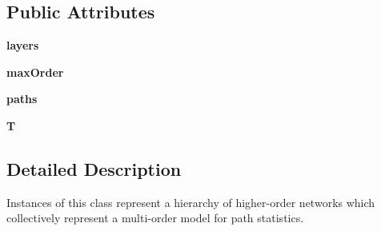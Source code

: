 \subsection*{Public Attributes}
\begin{DoxyCompactItemize}
\item 
\hypertarget{classpathpy_1_1MultiOrderModel_1_1MultiOrderModel_abc678904e6dd23fc36bace35f8c8b651}{{\bfseries layers}}\label{classpathpy_1_1MultiOrderModel_1_1MultiOrderModel_abc678904e6dd23fc36bace35f8c8b651}

\item 
\hypertarget{classpathpy_1_1MultiOrderModel_1_1MultiOrderModel_ad77293d316dbc4264e07d33f15c43f55}{{\bfseries max\-Order}}\label{classpathpy_1_1MultiOrderModel_1_1MultiOrderModel_ad77293d316dbc4264e07d33f15c43f55}

\item 
\hypertarget{classpathpy_1_1MultiOrderModel_1_1MultiOrderModel_adf751f249355e9a26e8062050567cf54}{{\bfseries paths}}\label{classpathpy_1_1MultiOrderModel_1_1MultiOrderModel_adf751f249355e9a26e8062050567cf54}

\item 
\hypertarget{classpathpy_1_1MultiOrderModel_1_1MultiOrderModel_a93118aa6719067efdbe8b38ef85a578a}{{\bfseries T}}\label{classpathpy_1_1MultiOrderModel_1_1MultiOrderModel_a93118aa6719067efdbe8b38ef85a578a}

\end{DoxyCompactItemize}


\subsection{Detailed Description}
\begin{DoxyVerb}Instances of this class represent a hierarchy of 
    higher-order networks which collectively represent 
    a multi-order model for path statistics. \end{DoxyVerb}
 

